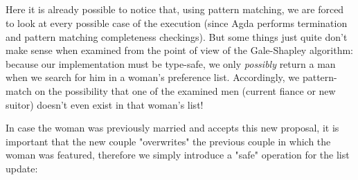 {\begin{code}
\\
\>[0]\AgdaSpace{}%
\AgdaSymbol{|}\AgdaSpace{}%
\AgdaSpace{}%
\AgdaSymbol{|}\AgdaSpace{}%
\AgdaSpace{}%
%
\>[24]\AgdaSymbol{=}\AgdaSpace{}%
\<%
\\
\>[0]\<%
\\
\>[0]\AgdaSpace{}%
\AgdaSymbol{|}\AgdaSpace{}%
\AgdaSpace{}%
\AgdaSymbol{|}\AgdaSpace{}%
\AgdaSpace{}%
\AgdaSymbol{=}\AgdaSpace{}%
\<%
\\
\>[0]\<%
\end{code}

Here it is already possible to notice that, using pattern matching, we are forced to look at every possible case of the execution (since Agda performs termination and pattern matching completeness checkings). But some things just quite don't make sense when examined from the point of view of the Gale-Shapley algorithm: because our implementation must be type-safe, we only \emph{possibly} return a man when we search for him in a woman's preference list. Accordingly, we pattern-match on the possibility that one of the examined men (current fiance or new suitor) doesn't even exist in that woman's list!

In case the woman was previously married and accepts this new proposal, it is important that the new couple "overwrites" the previous couple in which the woman was featured, therefore we simply introduce a "safe" operation for the list update:

}
